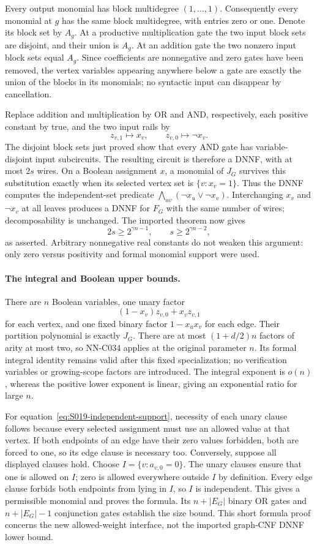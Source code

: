 Every output monomial has block multidegree $(1,\ldots,1)$.
Consequently every monomial at $g$ has the same block multidegree,
with entries zero or one.  Denote its block set by $A_g$.
At a productive multiplication gate the two input block sets
are disjoint, and their union is $A_g$.  At an addition gate
the two nonzero input block sets equal $A_g$.
Since coefficients are nonnegative and zero gates have been
removed, the vertex variables appearing anywhere below a gate
are exactly the union of the blocks in its monomials; no
syntactic input can disappear by cancellation.

Replace addition and multiplication by OR and AND, respectively,
each positive constant by true, and the two input rails by
\[
                         z_{v,1}\mapsto x_v,
                 \qquad z_{v,0}\mapsto\neg x_v.
\]
The disjoint block sets just proved show that every AND gate
has variable-disjoint input subcircuits.  The resulting circuit
is therefore a DNNF, with at most $2s$ wires.  On a Boolean
assignment $x$, a monomial of $J_G$ survives this substitution
exactly when its selected vertex set is $\{v:x_v=1\}$.
Thus the DNNF computes the independent-set predicate
$\bigwedge_{uv}(\neg x_u\vee\neg x_v)$.
Interchanging $x_v$ and $\neg x_v$ at all leaves produces a
DNNF for $F_G$ with the same number of wires; decomposability
is unchanged.  The imported theorem now gives
\[
                       2s\ge2^{\gamma n-1},
             \qquad s\ge2^{\gamma n-2},
\]
as asserted.  Arbitrary nonnegative real constants do not
weaken this argument: only zero versus positivity and formal
monomial support were used.

\paragraph{The integral and Boolean upper bounds.}
There are $n$ Boolean variables, one unary factor
\[
                (1-x_v)z_{v,0}+x_vz_{v,1}
\]
for each vertex, and one fixed binary factor $1-x_ux_v$ for
each edge.  Their partition polynomial is exactly $J_G$.
There are at most $(1+d/2)n$ factors of arity at most two,
so NN-C034 applies at the original parameter $n$.  Its formal
integral identity remains valid after this fixed specialization;
no verification variables or growing-scope factors are introduced.
The integral exponent is $o(n)$, whereas the positive lower
exponent is linear, giving an exponential ratio for large $n$.

For equation~\eqref{eq:S019-independent-support}, necessity of
each unary clause follows because every selected assignment
must use an allowed value at that vertex.  If both endpoints
of an edge have their zero values forbidden, both are forced
to one, so its edge clause is necessary too.  Conversely,
suppose all displayed clauses hold.  Choose
$I=\{v:a_{v,0}=0\}$.  The unary clauses ensure that one is
allowed on $I$; zero is allowed everywhere outside $I$ by
definition.  Every edge clause forbids both endpoints from
lying in $I$, so $I$ is independent.  This gives a permissible
monomial and proves the formula.  Its $n+|E_G|$ binary OR
gates and $n+|E_G|-1$ conjunction gates establish the size bound.
This short formula proof concerns the new allowed-weight
interface, not the imported graph-CNF DNNF lower bound.

